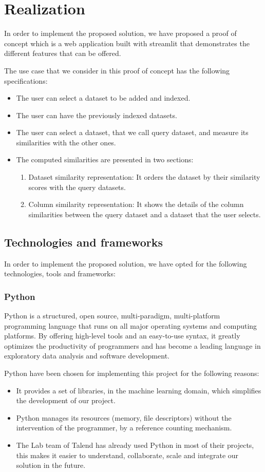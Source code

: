 \chapter{Realization}
In order to implement the proposed solution, we have proposed a proof of concept
which is a web application built with streamlit that demonstrates the different
features that can be offered.

The use case that we consider in this proof of concept has the following specifications:
\begin{itemize}
    \item The user can select a dataset to be added and indexed.
    \item The user can have the previously indexed datasets.
    \item The user can select a dataset, that we call query dataset, and measure
    its similarities with the other ones.
    \item The computed similarities are presented in two sections:
    \begin{enumerate}
        \item Dataset similarity representation: It orders the dataset by their
        similarity scores with the query datasets.
        \item Column similarity representation: It shows the details of the
        column similarities between the query dataset and a dataset that the
        user selects.
    \end{enumerate}
\end{itemize}


\section{Technologies and frameworks}
In order to implement the proposed solution, we have opted for the following
technologies, tools and frameworks:
\subsection{Python}
Python is a structured, open source, multi-paradigm, multi-platform programming
language that runs on all major operating systems and computing platforms. By
offering high-level tools and an easy-to-use syntax, it greatly optimizes the
productivity of programmers and has become a leading language in exploratory
data analysis and software development.

Python have been chosen for implementing this project for the following reasons:
\begin{itemize}
    \item It provides a set of libraries, in the machine learning domain, which
    simplifies the development of our project.
    \item Python manages its resources (memory, file descriptors) without the
    intervention of the programmer, by a reference counting mechanism.
    \item The Lab team of Talend has already used Python in most of their
    projects, this makes it easier to understand, collaborate, scale and
    integrate our solution in the future.
\end{itemize}

